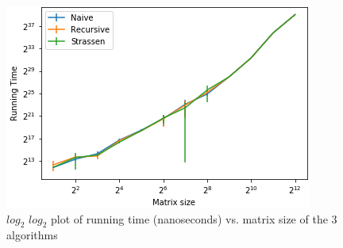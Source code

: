 \documentclass{tufte-handout}
\begin{document}
\begin{figure}[!h]
  \includegraphics[width=\linewidth]{out/matrixMultiplication/matrixmult.png}
  \caption{$log_2$ $log_2$ plot of running time (nanoseconds) vs. matrix size of the $3$ algorithms}
  \label{fig:Plot}
\end{figure}
\end{document}
